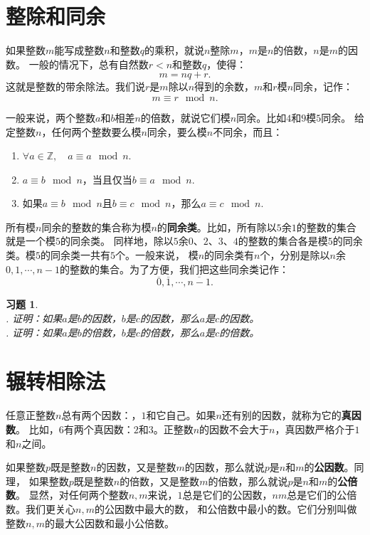 \documentclass[12pt,UTF8]{ctexbook}
\newtheorem{xt}{习题}[section]
\begin{document}
\section{整除和同余}
如果整数$m$能写成整数$n$和整数$q$的乘积，就说$n$整除$m$，$m$是$n$的倍数，$n$是$m$的因数。
一般的情况下，总有自然数$r < n$和整数$q$，使得：
$$ m = nq + r.$$
这就是整数的带余除法。我们说$r$是$m$除以$n$得到的余数，$m$和$r$模$n$同余，记作：
$$ m \equiv r \mod n.$$

一般来说，两个整数$a$和$b$相差$n$的倍数，就说它们模$n$同余。比如$4$和$9$模$5$同余。
给定整数$n$，任何两个整数要么模$n$同余，要么模$n$不同余，而且：
\begin{enumerate}
    \item $\forall a \in \mathbb{Z}, \quad a \equiv a \mod n.$
    \item $a \equiv b \mod n$，当且仅当$b \equiv a \mod n.$
    \item 如果$a \equiv b \mod n$且$b \equiv c \mod n$，那么$a \equiv c \mod n.$
\end{enumerate}
所有模$n$同余的整数的集合称为模$n$的\textbf{同余类}。比如，所有除以$5$余$1$的整数的集合就是一个模$5$的同余类。
同样地，除以$5$余$0$、$2$、$3$、$4$的整数的集合各是模$5$的同余类。模$5$的同余类一共有$5$个。一般来说，
模$n$的同余类有$n$个，分别是除以$n$余$0,1,\cdots,n-1$的整数的集合。为了方便，我们把这些同余类记作：
$$ \overline{0}, \overline{1}, \cdots , \overline{n-1}.$$
\begin{xt}\label{xt:5-0-0}
    \mbox{}\\
    . 证明：如果$a$是$b$的因数，$b$是$c$的因数，那么$a$是$c$的因数。\\
    . 证明：如果$a$是$b$的倍数，$b$是$c$的倍数，那么$a$是$c$的倍数。
\end{xt}

\section{辗转相除法}
任意正整数$n$总有两个因数：，$1$和它自己。如果$n$还有别的因数，就称为它的\textbf{真因数}。
比如，$6$有两个真因数：$2$和$3$。正整数$n$的因数不会大于$n$，真因数严格介于$1$和$n$之间。

如果整数$p$既是整数$n$的因数，又是整数$m$的因数，那么就说$p$是$n$和$m$的\textbf{公因数}。同理，
如果整数$p$既是整数$n$的倍数，又是整数$m$的倍数，那么就说$p$是$n$和$m$的\textbf{公倍数}。
显然，对任何两个整数$n,m$来说，$1$总是它们的公因数，$nm$总是它们的公倍数。我们更关心$n,m$的公因数中最大的数，
和公倍数中最小的数。它们分别叫做整数$n,m$的最大公因数和最小公倍数。
\end{document}
